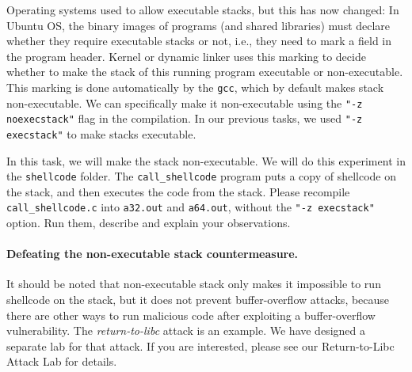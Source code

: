 
Operating systems used to allow executable stacks, but
this has now changed: In Ubuntu OS, the binary images of programs (and shared libraries)
must declare whether they require executable stacks or not, i.e., they need to
mark a field in the program header. Kernel or dynamic linker uses this marking
to decide whether to make the stack of this running program executable or
non-executable. This marking is done automatically by the
\texttt{gcc}, which by default makes stack
non-executable. We can specifically make it non-executable
using the \texttt{"-z noexecstack"} flag in the compilation.
In our previous tasks, we used \texttt{"-z execstack"} to
make stacks executable.


In this task, we will make the stack non-executable. We will do
this experiment in the \texttt{shellcode} folder.
The \texttt{call\_shellcode} program puts a copy of shellcode
on the stack, and then executes the code from the stack.
Please recompile \texttt{call\_shellcode.c}
into \texttt{a32.out} and \texttt{a64.out}, without
the \texttt{"-z execstack"} option.
Run them, describe and explain your observations.


\paragraph{Defeating the non-executable stack countermeasure.}
It should be noted that non-executable stack only makes it
impossible to run shellcode
on the stack, but it does not prevent buffer-overflow attacks,
because there are other ways to run malicious code after exploiting
a buffer-overflow vulnerability. The {\em return-to-libc} attack
is an example. We have designed a separate lab for that
attack. If you are interested, please see our
Return-to-Libc Attack Lab for details.

